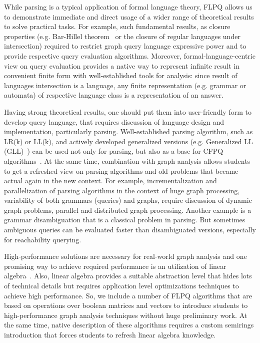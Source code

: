 \documentclass[sigconf]{acmart}
\begin{document}
While parsing is a typical application of formal language theory, FLPQ allows us to demonstrate immediate and direct usage of a wider range of theoretical results to solve practical tasks.
For example, such fundamental results, as closure properties (e.g. Bar-Hillel theorem~\cite{BarHillel61} or the closure of regular languages under intersection) required to restrict graph query language expressive power and to provide respective query evaluation algorithms.
Moreover, formal-language-centric view on query evaluation provides a native way to represent infinite result in convenient finite form with well-established tools for analysis: since result of languages intersection is a language, any finite representation (e.g. grammar or automata) of respective language class is a representation of an answer.

Having strong theoretical results, one should put them into user-friendly form to develop query language, that requires discussion of language design and implementation, particularly parsing.
Well-established parsing algorithm, such as LR(k) or LL(k), and actively developed generalized versions (e.g. Generalized LL (GLL)~\cite{10.1007/978-3-662-46663-6_5}) can be used not only for parsing, but also as a base for CFPQ algorithms~\cite{MEDEIROS201975,10.1007/978-3-319-91662-0_17, 10.1145/3166094.3166104}.
At the same time, combination with graph analysis allows students to get a refreshed view on parsing algorithms and old problems that became actual again in the new context.
For example, incrementalization and parallelization of parsing algorithms in the context of huge graph processing, variability of both grammars (queries) and graphs, require discussion of dynamic graph problems, parallel and distributed graph processing.
Another example is a grammar disambiguation that is a classical problem in parsing.
But sometimes ambiguous queries can be evaluated faster than disambiguated versions, especially for reachability querying.

High-performance solutions are necessary for real-world graph analysis and one promising way to achieve required performance is an utilization of linear algebra~\cite{suitesparse}.
Also, linear algebra provides a suitable abstraction level that hides lots of technical details but requires application level optimizations techniques to achieve high performance.
So, we include a number of FLPQ algorithms that are based on operations over boolean matrices and vectors to introduce students to high-performance graph analysis techniques without huge preliminary work.
At the same time, native description of these algorithms requires a custom semirings introduction that forces students to refresh linear algebra knowledge. 
\end{document}

